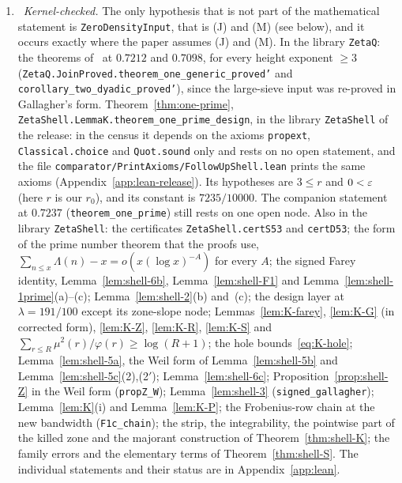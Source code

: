 \begin{enumerate}[label=(\alph*)]
\item \tagL\ \emph{Kernel-checked.} The only hypothesis that is not part of the mathematical statement is \texttt{ZeroDensityInput}, that is (J) and
(M) (see below), and it occurs exactly where the paper assumes (J) and (M).
In the library \texttt{ZetaQ}: the theorems of~\cite{DSouza} at $0.7212$ and $0.7098$, for every height exponent $\ge3$
(\texttt{ZetaQ.JoinProved.theorem\_one\_generic\_proved'} and \texttt{corollary\_two\_dyadic\_proved'}), since the large-sieve input was re-proved in
Gallagher's form.
Theorem~\ref{thm:one-prime}, \texttt{ZetaShell.LemmaK.theorem\_one\_prime\_design}, in the library \texttt{ZetaShell} of the release: in the census it
depends on the axioms \texttt{propext}, \texttt{Classical.choice} and \texttt{Quot.sound} only and rests on no open statement, and the file
\texttt{comparator/PrintAxioms/FollowUpShell.lean} prints the same axioms (Appendix~\ref{app:lean-release}). Its hypotheses are $3\le r$ and $0<\varepsilon$
(here $r$ is our $r_0$), and its constant is $7235/10000$. The companion statement at $0.7237$ (\texttt{theorem\_one\_prime}) still rests on one open
node.
Also in the library \texttt{ZetaShell}: the certificates \texttt{ZetaShell.certS53} and \texttt{certD53}; the form of the prime number theorem that
the proofs use, $\sum_{n\le x}\Lambda(n)-x=o(x(\log x)^{-A})$ for every $A$; the signed Farey identity, Lemma~\ref{lem:shell-6b},
Lemma~\ref{lem:shell-F1} and Lemma~\ref{lem:shell-1prime}(a)--(c); Lemma~\ref{lem:shell-2}(b) and~(c); the design layer at $\lambda=191/100$ except its
zone-slope node; Lemmas~\ref{lem:K-farey}, \ref{lem:K-G} (in corrected form), \ref{lem:K-Z}, \ref{lem:K-R}, \ref{lem:K-S} and
$\sum_{r\le R}\mu^2(r)/\varphi(r)\ge\log(R+1)$; the hole bounds~\eqref{eq:K-hole}; Lemma~\ref{lem:shell-5a}, the Weil form of
Lemma~\ref{lem:shell-5b} and Lemma~\ref{lem:shell-5c}(2),(2$'$); Lemma~\ref{lem:shell-6c}; Proposition~\ref{prop:shell-Z} in the Weil form
(\texttt{propZ\_W}); Lemma~\ref{lem:shell-3} (\texttt{signed\_gallagher}); Lemma~\ref{lem:K}(i) and Lemma~\ref{lem:K-P}; the Frobenius-row chain at the
new bandwidth (\texttt{F1c\_chain}); the strip, the integrability, the pointwise part of the killed zone and the majorant construction of
Theorem~\ref{thm:shell-K}; the family errors and the elementary terms of Theorem~\ref{thm:shell-S}. The individual statements and their status are in
Appendix~\ref{app:lean}.


\end{enumerate}
